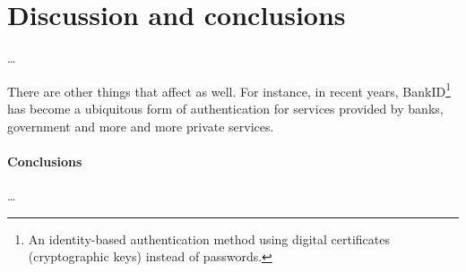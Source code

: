\section{Discussion and conclusions}

\dots

There are other things that affect as well.
For instance, in recent years, BankID\footnote{%
  An identity-based authentication method using digital certificates 
  (cryptographic keys) instead of passwords.
} has become a ubiquitous form of authentication for services provided by 
banks, government and more and more private services.

\paragraph{Conclusions}

\dots
